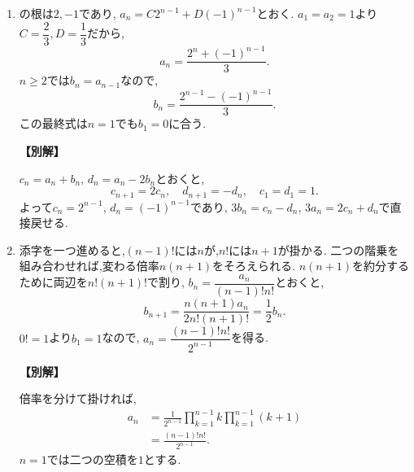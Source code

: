 \begin{enumerate}[label=\textbf{問\arabic*.},leftmargin=3.8em,format=\bookitemlink{practice-basic}{solution}{problem}]
          \item {}
                  の根は$2,-1$であり,
                  $a_n=C2^{n-1}+D(-1)^{n-1}$とおく.
                  $a_1=a_2=1$より$C=\dfrac{2}{3},D=\dfrac{1}{3}$だから,
                  \[
                    a_n=\frac{2^n+(-1)^{n-1}}3.
                  \]
                  $n\ge2$では$b_n=a_{n-1}$なので,
                  \[
                    b_n=\frac{2^{n-1}-(-1)^{n-1}}3.
                  \]
                  この最終式は$n=1$でも$b_1=0$に合う.
                  \par\smallskip\noindent\textbf{【別解】}\par
                  $c_n=a_n+b_n$, $d_n=a_n-2b_n$とおくと,
                  \[
                    c_{n+1}=2c_n,\quad d_{n+1}=-d_n,
                    \quad c_1=d_1=1.
                  \]
                  よって$c_n=2^{n-1}$, $d_n=(-1)^{n-1}$であり,
                  $3b_n=c_n-d_n$, $3a_n=2c_n+d_n$で直接戻せる.

          \item 添字を一つ進めると,$(n-1)!$には$n$が,$n!$には$n+1$が掛かる.
                  二つの階乗を組み合わせれば,変わる倍率$n(n+1)$をそろえられる.
                  $n(n+1)$を約分するために両辺を$n!(n+1)!$で割り,\BookMathLayout{}{\\}%
                  $b_n=\dfrac{a_n}{(n-1)!n!}$とおくと,
                  \[
                    b_{n+1}=\frac{n(n+1)a_n}{2n!(n+1)!}
                           =\frac12b_n.
                  \]
                  $0!=1$より$b_1=1$なので,\BookMathLayout{}{\\}%
                  $a_n=\dfrac{(n-1)!n!}{2^{n-1}}$を得る.
                  \par\smallskip\noindent\textbf{【別解】}\par
                  倍率を分けて掛ければ,
                  \[
                  \begin{aligned}
                    a_n&=\frac1{2^{n-1}}\prod_{k=1}^{n-1}k
                                               \prod_{k=1}^{n-1}(k+1)\\
                       &=\frac{(n-1)!n!}{2^{n-1}}.
                  \end{aligned}
                  \]
                  $n=1$では二つの空積を$1$とする.


\end{enumerate}
